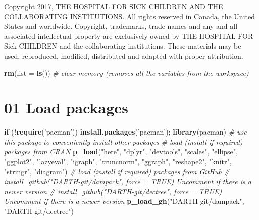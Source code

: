 \documentclass[
]{article}
\newenvironment{Shaded}{\begin{snugshade}}{\end{snugshade}}
\newcommand{\CommentTok}[1]{\textcolor[rgb]{0.56,0.35,0.01}{\textit{#1}}}
\newcommand{\ControlFlowTok}[1]{\textcolor[rgb]{0.13,0.29,0.53}{\textbf{#1}}}
\newcommand{\DataTypeTok}[1]{\textcolor[rgb]{0.13,0.29,0.53}{#1}}
\newcommand{\KeywordTok}[1]{\textcolor[rgb]{0.13,0.29,0.53}{\textbf{#1}}}
\newcommand{\NormalTok}[1]{#1}
\newcommand{\OperatorTok}[1]{\textcolor[rgb]{0.81,0.36,0.00}{\textbf{#1}}}
\newcommand{\StringTok}[1]{\textcolor[rgb]{0.31,0.60,0.02}{#1}}
\begin{document}
Copyright 2017, THE HOSPITAL FOR SICK CHILDREN AND THE COLLABORATING
INSTITUTIONS. All rights reserved in Canada, the United States and
worldwide. Copyright, trademarks, trade names and any and all associated
intellectual property are exclusively owned by THE HOSPITAL FOR Sick
CHILDREN and the collaborating institutions. These materials may be
used, reproduced, modified, distributed and adapted with proper
attribution.

\newpage

\begin{Shaded}
\begin{Highlighting}[]
\KeywordTok{rm}\NormalTok{(}\DataTypeTok{list =} \KeywordTok{ls}\NormalTok{())      }\CommentTok{# clear memory (removes all the variables from the workspace)}
\end{Highlighting}
\end{Shaded}

\hypertarget{load-packages}{%
\section{01 Load packages}\label{load-packages}}

\begin{Shaded}
\begin{Highlighting}[]
\ControlFlowTok{if}\NormalTok{ (}\OperatorTok{!}\KeywordTok{require}\NormalTok{(}\StringTok{'pacman'}\NormalTok{)) }\KeywordTok{install.packages}\NormalTok{(}\StringTok{'pacman'}\NormalTok{); }\KeywordTok{library}\NormalTok{(pacman) }\CommentTok{# use this package to conveniently install other packages}
\CommentTok{# load (install if required) packages from CRAN}
\KeywordTok{p_load}\NormalTok{(}\StringTok{"here"}\NormalTok{, }\StringTok{"dplyr"}\NormalTok{, }\StringTok{"devtools"}\NormalTok{, }\StringTok{"scales"}\NormalTok{, }\StringTok{"ellipse"}\NormalTok{, }\StringTok{"ggplot2"}\NormalTok{, }\StringTok{"lazyeval"}\NormalTok{, }\StringTok{"igraph"}\NormalTok{, }\StringTok{"truncnorm"}\NormalTok{, }\StringTok{"ggraph"}\NormalTok{, }\StringTok{"reshape2"}\NormalTok{, }\StringTok{"knitr"}\NormalTok{, }\StringTok{"stringr"}\NormalTok{, }\StringTok{"diagram"}\NormalTok{)                                               }
\CommentTok{# load (install if required) packages from GitHub}
\CommentTok{# install_github("DARTH-git/dampack", force = TRUE) Uncomment if there is a newer version}
\CommentTok{# install_github("DARTH-git/dectree", force = TRUE) Uncomment if there is a newer version}
\KeywordTok{p_load_gh}\NormalTok{(}\StringTok{"DARTH-git/dampack"}\NormalTok{, }\StringTok{"DARTH-git/dectree"}\NormalTok{)}
\end{Highlighting}
\end{Shaded}
\end{document}
